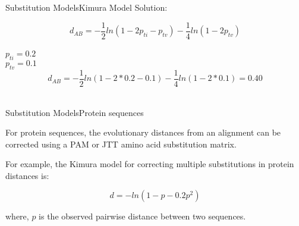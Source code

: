 \documentclass[10pt]{beamer}
\newcommand{\1}{
	\setbeamertemplate{background}{
		\texttt{[image: img/1]}
		\tikz[overlay] \fill[fill opacity=0.75,fill=white] (0,0) rectangle (-\paperwidth,\paperheight);
	}
}
\begin{document}
\begin{frame}{Substitution Models}{Kimura Model}	
	Solution:
	
	\begin{equation*}
	d_{AB} = -\frac{1}{2} ln (1 -  2p_{ti} - p_{tv} ) - \frac{1}{4}  ln (1 - 2p_{tv} )  
	\end{equation*}\\	

	$p_{ti} = 0.2$ \\
	$p_{tv} = 0.1$ \\
	
	\begin{equation*}
	d_{AB} = -\frac{1}{2} ln (1 -  2*0.2 - 0.1 ) - \frac{1}{4}  ln (1 - 2*0.1 )  = 0.40
	\end{equation*}\\
	
\end{frame}



\begin{frame}{Substitution Models}{Protein sequences}	
	\begin{block}{}
		For protein sequences, the evolutionary distances from an alignment can be corrected using a PAM or JTT amino acid substitution matrix.
	\end{block}	

	For example, the Kimura model for correcting multiple substitutions in
	protein distances is:
	
	\begin{equation}
	d = -ln (1 - p - 0.2p^2)
	\end{equation}
	
	where, $p$ is the observed pairwise distance between two sequences.

\end{frame}
\end{document}
